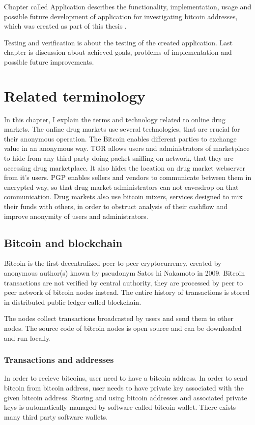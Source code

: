 \documentclass[
  digital, %
  table,   %
  lof,     %
  lot,     %
  oneside
]{fithesis3}
\begin{document}
Chapter called Application describes the functionality, implementation, usage and 
possible future development of application for investigating bitcoin addresses, which was created as part of this thesis
.

Testing and verification is about the testing of the created application.
Last chapter is discussion about achieved goals, problems of implementation and possible future improvements.

\chapter{Related terminology}

In this chapter, I explain the terms and technology related to online drug markets.
The online drug markets use several technologies, that are crucial for their anonymous operation.
The Bitcoin enables different parties to exchange value in an anonymous way.
TOR allows users and administrators of marketplace to hide from any third party doing packet sniffing on network,
that they are accessing drug marketplace. It also hides the location on drug market webserver from it's users.
PGP enables sellers and vendors to communicate between them in encrypted way,
so that drug market administrators can not eavesdrop on that communication.
Drug markets also use bitcoin mixers, services designed to mix their funds with others, in order to obstruct
analysis of their cashflow and improve anonymity of users and administrators.

\section{Bitcoin and blockchain}

Bitcoin is  the first decentralized peer to peer cryptocurrency, created by anonymous author(s) known by pseudonym Satos
hi Nakamoto in 2009.
Bitcoin transactions are not verified by central authority, they are  
processed by peer to peer network of bitcoin nodes instead. 
The entire history of transactions is stored in distributed public ledger called blockchain.

The nodes collect transactions broadcasted by users and send them to other nodes.
The source code of bitcoin nodes is open source and can be downloaded and run locally. 

\subsection{Transactions and addresses}
In order to recieve bitcoins, user need to have a bitcoin address. In order to send bitcoin from bitcoin address,
 user needs to have private key associated with the given bitcoin address.
Storing and using bitcoin addresses and associated private keys is automatically managed
by software called bitcoin wallet. There exists many third party software wallets.
\end{document}
